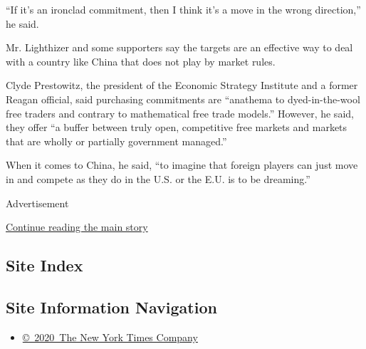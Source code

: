 ``If it's an ironclad commitment, then I think it's a move in the wrong
direction,'' he said.

Mr. Lighthizer and some supporters say the targets are an effective way
to deal with a country like China that does not play by market rules.

Clyde Prestowitz, the president of the Economic Strategy Institute and a
former Reagan official, said purchasing commitments are ``anathema to
dyed-in-the-wool free traders and contrary to mathematical free trade
models.'' However, he said, they offer ``a buffer between truly open,
competitive free markets and markets that are wholly or partially
government managed.''

When it comes to China, he said, ``to imagine that foreign players can
just move in and compete as they do in the U.S. or the E.U. is to be
dreaming.''

Advertisement

\protect\hyperlink{after-bottom}{Continue reading the main story}

\hypertarget{site-index}{%
\subsection{Site Index}\label{site-index}}

\hypertarget{site-information-navigation}{%
\subsection{Site Information
Navigation}\label{site-information-navigation}}

\begin{itemize}
\tightlist
\item
  \href{https://help.nytimes.com/hc/en-us/articles/115014792127-Copyright-notice}{©~2020~The
  New York Times Company}
\end{itemize}

